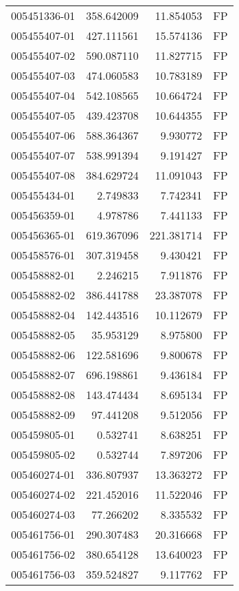 \begin{tabular}{lrrl}
005451336-01 &  358.642009 &    11.854053 &   FP \\
005455407-01 &  427.111561 &    15.574136 &   FP \\
005455407-02 &  590.087110 &    11.827715 &   FP \\
005455407-03 &  474.060583 &    10.783189 &   FP \\
005455407-04 &  542.108565 &    10.664724 &   FP \\
005455407-05 &  439.423708 &    10.644355 &   FP \\
005455407-06 &  588.364367 &     9.930772 &   FP \\
005455407-07 &  538.991394 &     9.191427 &   FP \\
005455407-08 &  384.629724 &    11.091043 &   FP \\
005455434-01 &    2.749833 &     7.742341 &   FP \\
005456359-01 &    4.978786 &     7.441133 &   FP \\
005456365-01 &  619.367096 &   221.381714 &   FP \\
005458576-01 &  307.319458 &     9.430421 &   FP \\
005458882-01 &    2.246215 &     7.911876 &   FP \\
005458882-02 &  386.441788 &    23.387078 &   FP \\
005458882-04 &  142.443516 &    10.112679 &   FP \\
005458882-05 &   35.953129 &     8.975800 &   FP \\
005458882-06 &  122.581696 &     9.800678 &   FP \\
005458882-07 &  696.198861 &     9.436184 &   FP \\
005458882-08 &  143.474434 &     8.695134 &   FP \\
005458882-09 &   97.441208 &     9.512056 &   FP \\
005459805-01 &    0.532741 &     8.638251 &   FP \\
005459805-02 &    0.532744 &     7.897206 &   FP \\
005460274-01 &  336.807937 &    13.363272 &   FP \\
005460274-02 &  221.452016 &    11.522046 &   FP \\
005460274-03 &   77.266202 &     8.335532 &   FP \\
005461756-01 &  290.307483 &    20.316668 &   FP \\
005461756-02 &  380.654128 &    13.640023 &   FP \\
005461756-03 &  359.524827 &     9.117762 &   FP \\

\end{tabular}
